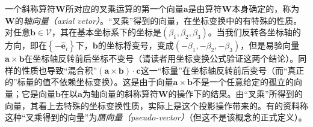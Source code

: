 \documentclass[main.tex]{subfiles}
\begin{document}
一个斜称算符$\mathbf{W}$所对应的叉乘运算的第一个向量$\mathbf{a}$是由算符$\mathbf{W}$本身确定的，称为$\mathbf{W}$的\emph{轴向量（axial vetor）}。“叉乘”得到的向量，在坐标变换中的有特殊的性质。对任意$\mathbf{b}\in\mathcal{V}$，其在基本坐标系下的坐标是$\left(\beta_1,\beta_2,\beta_3\right)$。当我们反转各坐标轴的方向，即在$\left\{-\mathbf{\hat{e}}_i\right\}$下，$\mathbf{b}$的坐标将变号，变成$\left(-\beta_1,-\beta_2,-\beta_3\right)$，但是易验向量$\mathbf{a}\times\mathbf{b}$在坐标轴反转前后坐标不变号（请读者用坐标变换公式验证这两个结论）。同样的性质也导致“混合积”$\left(\mathbf{a}\times\mathbf{b}\right)\cdot\mathbf{c}$这一“标量”在坐标轴反转前后变号（而“真正的”标量的值不依赖坐标变换）。这是由于向量$\mathbf{a}\times\mathbf{b}$不是一个任意给定的孤立的向量；它是向量$\mathbf{b}$在以$\mathbf{a}$为轴向量的斜称算符$\mathbf{W}$的操作下的结果。由“叉乘”所得到的向量，其看上去特殊的坐标变换性质，实际上是这个投影操作带来的。有的资料称这种“叉乘得到的向量”为\emph{赝向量（pseudo-vector）}（但这不是该概念的正式定义）。
\end{document}

